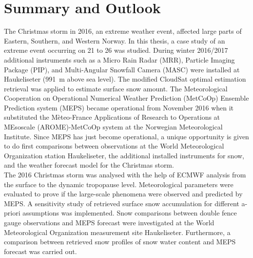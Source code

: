 
\chapter{Summary and Outlook}
The Christmas storm in 2016, an extreme weather event,
affected large parts of Eastern, Southern, and Western Norway. 
In this thesis, a case study of an extreme event occurring on \num{21} to \SI{26}{\dec} was studied. During winter 2016/2017 additional instruments such as a Micro Rain Radar (MRR), Particle Imaging Package (PIP), and Multi-Angular Snowfall Camera (MASC) were installed at Haukeliseter (\SI{991}{\metre} above sea level). The modified CloudSat optimal estimation retrieval was applied to estimate surface snow amount. 
The Meteorological Cooperation on Operational Numerical Weather Prediction (MetCoOp) Ensemble Prediction system (MEPS) became operational from November 2016 when it substituted the Mèteo-France Applications of Research to Operations at MEsoscale (AROME)-MetCoOp system at the Norwegian Meteorological Institute. Since MEPS has just become operational, a unique opportunity is given to do first comparisons between observations at the World Meteorological Organization station Haukeliseter, the additional installed instruments for snow, and the weather forecast model for the Christmas storm.
\\
The 2016 Christmas storm was analysed with the help of ECMWF analysis from the surface to the dynamic tropopause level. Meteorological parameters were evaluated to prove if the large-scale phenomena were observed and predicted by MEPS.
A sensitivity study of retrieved surface snow accumulation for different a-priori assumptions was implemented. 
Snow comparisons between double fence gauge observations and MEPS forecast were investigated at the World Meteorological Organization measurement site Haukeliseter. 
Furthermore, a comparison between retrieved snow profiles of snow water content and MEPS forecast was carried out. %
\par\medskip
